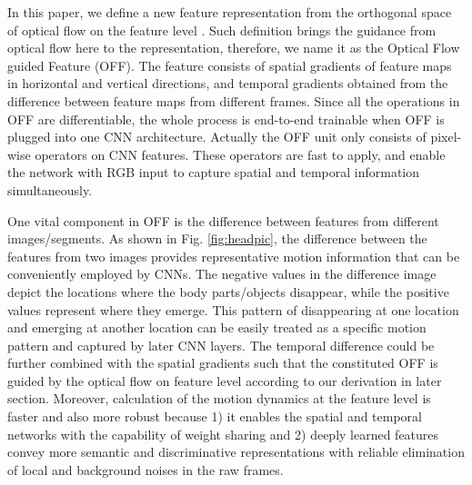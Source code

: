 \documentclass[10pt,twocolumn,letterpaper]{article}
\begin{document}
In this paper, we define a new feature representation from the orthogonal space of optical flow on the feature level \cite{HornBertholdK.P.;Schunck1981}. Such definition brings the guidance from optical flow here to the representation, therefore, we name it as the Optical Flow guided Feature (OFF). The feature consists of spatial gradients of feature maps in horizontal and vertical directions, and temporal gradients obtained from the difference between feature maps from different frames. Since all the operations in OFF are differentiable, the whole process is end-to-end trainable when OFF is plugged into one CNN architecture. Actually the OFF unit only consists of pixel-wise operators on CNN features. These operators are fast to apply, and enable the network with RGB input to capture spatial and temporal information simultaneously.

One vital component in OFF is the difference between features from different images/segments. As shown in Fig. \ref{fig:headpic}, the difference between the features from two images provides representative motion information that can be conveniently employed by CNNs. The negative values in the difference image depict the locations where the body parts/objects disappear, while the positive values represent where they emerge. This pattern of disappearing at one location and emerging at another location can be easily treated as a specific motion pattern and captured by later CNN layers. The temporal difference could be further combined with the spatial gradients such that the constituted OFF is guided by the optical flow on feature level according to our derivation in later section. Moreover, calculation of the motion dynamics at the feature level is faster and  also more robust because 1) it enables the spatial and temporal networks with the capability of weight sharing and 2) deeply learned features convey more semantic and discriminative representations with reliable elimination of local and background noises in the raw frames.
\end{document}
